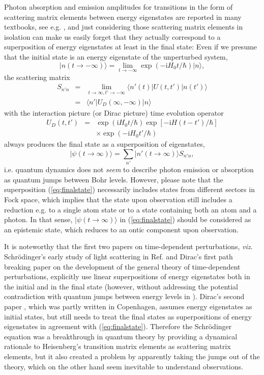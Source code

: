 \documentclass[final,3p,12pt]{elsarticle3}
\begin{document}
Photon absorption and emission amplitudes for transitions in the form of 
scattering matrix elements between energy eigenstates are reported in many 
textbooks, see e.g. \cite{dirac2,heitler,merzbacher,ballentine2,louisqm,rdqm}, 
and just considering those scattering matrix elements in isolation can make 
us easily forget that they actually correspond to a superposition of energy 
eigenstates at least in the final state: Even if we presume that the initial 
state is an energy eigenstate of the unperturbed system,
\[
\bm{|}n(t\to-\infty)\bm{\rangle}=\lim_{t\to-\infty}\exp(-\mathrm{i}H_0t/\hbar)\bm{|}n\bm{\rangle},
\]
the scattering matrix
\begin{eqnarray}\nonumber
S_{n'n}&=&\lim_{t\to\infty,t'\to-\infty}\bm{\langle} n'(t)\bm{|}U(t,t')\bm{|}n(t')\bm{\rangle}
\\  \label{eq:smatrix1}
&=&\bm{\langle} n'\bm{|}U_D(\infty,-\infty)\bm{|}n\bm{\rangle}
\end{eqnarray}
with the interaction picture (or Dirac picture) time evolution operator
\begin{eqnarray}\nonumber 
U_D(t,t')&=&
\exp(\mathrm{i}H_0t/\hbar)
\exp[-\mathrm{i}H(t-t')/\hbar]
\\ \label{eq:UD}
&&\times
\exp(-\mathrm{i}H_0t'/\hbar)
\end{eqnarray}
always produces the final state as a superposition of eigenstates,
\begin{equation}\label{eq:finalstate}
\bm{|}\psi(t\to\infty)\bm{\rangle}=\sum_{n'}\bm{|}n'(t\to\infty)\bm{\rangle} S_{n'n},
\end{equation}
i.e. quantum dynamics does not {\it seem} to describe photon emission or 
absorption as quantum jumps between Bohr levels. However, 
please note that the superposition (\ref{eq:finalstate}) necessarily includes 
states from different sectors in Fock space, which implies that
the state upon observation still includes a reduction e.g. to a single atom
state or to a state containing both an atom and a photon. In that 
sense, $\bm{|}\psi(t\to\infty)\bm{\rangle}$ in (\ref{eq:finalstate}) should be 
considered as an epistemic state, which reduces to an ontic component 
upon observation.

It is noteworthy that the first two papers on time-dependent
perturbations, {\it viz.} Schr\"odinger's early study of light scattering
in Ref. \cite{erwin} and Dirac's first path breaking paper \cite{dirac1a} 
on the development of the general theory of time-dependent perturbations, 
explicitly use linear superpositions of energy eigenstates both in the 
initial and in the final state (however, without addressing the potential 
contradiction with quantum jumps between energy levels in \cite{dirac1a}). 
Dirac's second paper \cite{dirac1b}, which was partly written in Copenhagen,
assumes energy eigenstates as initial states, but still needs to treat
the final states as superpositions of energy eigenstates in agreement
with (\ref{eq:finalstate}).
Therefore the Schr\"odinger equation was a breakthrough in quantum theory 
by providing a dynamical rationale to Heisenberg's transition matrix 
elements as scattering matrix elements, but it also created a problem
by apparently taking the jumps out of the theory, which on the other 
hand seem inevitable to understand observations.
\end{document}
